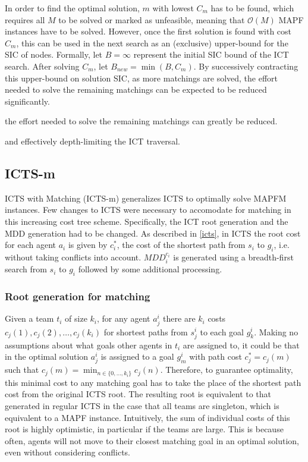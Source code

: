\documentclass[english]{article}
\begin{document}
	In order to find the optimal solution, $m$ with lowest $C_m$ has to be found, which requires all $M$ to be solved or marked as unfeasible, meaning that $\mathcal{O}(M)$ MAPF instances have to be solved. However, once the first solution is found with cost $C_m$, this can be used in the next search as an (exclusive) upper-bound for the SIC of nodes. Formally, let $B = \infty$ represent the initial SIC bound of the ICT search. After solving $C_m$, let $B_{new} = \min(B,C_m)$. By successively contracting this upper-bound on solution SIC, as more matchings are solved, the effort needed to solve the remaining matchings can be expected to be reduced significantly. 
	
	 the effort needed to solve the remaining matchings can greatly be reduced.
	
	 and effectively depth-limiting the ICT traversal. 
	
	\subsection{ICTS-m}
	ICTS with Matching (ICTS-m) generalizes ICTS to optimally solve MAPFM instances. Few changes to ICTS were necessary to accomodate for matching in this increasing cost tree scheme. Specifically, the ICT root generation and the MDD generation had to be changed. As described in \ref{icts}, in ICTS the root cost for each agent $a_i$ is given by $c^*_i$, the cost of the shortest path from $s_i$ to $g_i$, i.e. without taking conflicts into account. $MDD_i^{c_i}$ is generated using a breadth-first search from $s_i$ to $g_i$ followed by some additional processing.
	\subsubsection{Root generation for matching}
	Given a team $t_i$ of size $k_i$, for any agent $a_j^i$ there are $k_i$ costs $c_j(1),c_j(2),\ldots,c_j(k_i)$ for shortest paths from $s_j^i$ to each goal $g_k^i$. Making no assumptions about what goals other agents in $t_i$ are assigned to, it could be that in the optimal solution $a_j^i$ is assigned to a goal $g_{m}^i$ with path cost $c^*_j = c_j(m)$ such that $c_j(m) = \min_{n\in\{0,\ldots,k_i\}} c_j(n)$. Therefore, to guarantee optimality, this minimal cost to any matching goal has to take the place of the shortest path cost from the original ICTS root. The resulting root is equivalent to that generated in regular ICTS in the case that all teams are singleton, which is equivalent to a MAPF instance. Intuitively, the sum of individual costs of this root is highly optimistic, in particular if the teams are large. This is because often, agents will not move to their closest matching goal in an optimal solution, even without considering conflicts.
	
\end{document}
